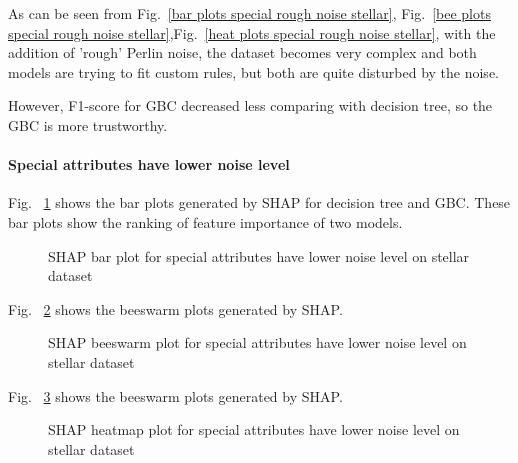 \documentclass[runningheads,a4paper]{llncs}
\begin{document}
As can be seen from Fig.~\ref{bar plots special rough noise stellar}, Fig.~\ref{bee plots special rough noise stellar},Fig.~\ref{heat plots special rough noise stellar}, with the addition of 'rough' Perlin noise, the dataset becomes very complex and both models are trying to fit custom rules, but both are quite disturbed by the noise.

However, F1-score for GBC decreased less comparing with decision tree, so the GBC is more trustworthy.

\paragraph{Special attributes have lower noise level}
Fig. ~\ref{bar plots special smooth noise stellar} shows the bar plots generated by SHAP for decision tree and GBC. These bar plots show the ranking of feature importance of two models.
\begin{figure}[H]
	\centering
	
	\hfill
	
	
	\caption{SHAP bar plot for special attributes have lower noise level on stellar dataset}
	\label{bar plots special smooth noise stellar}
\end{figure}



Fig. ~\ref{bee plots special smooth noise stellar} shows the beeswarm plots generated by SHAP.
\begin{figure}[H]
	\centering
	
	\hfill
	
	
	\caption{SHAP beeswarm plot for special attributes have lower noise level on stellar dataset}
	\label{bee plots special smooth noise stellar}
	
\end{figure}
Fig. ~\ref{heat plots special smooth noise stellar} shows the beeswarm plots generated by SHAP.
\begin{figure}[H]
	\centering
	
	\hfill
	
	
	\caption{SHAP heatmap plot for special attributes have lower noise level on stellar dataset}
	\label{heat plots special smooth noise stellar}
	
\end{figure}
\end{document}
